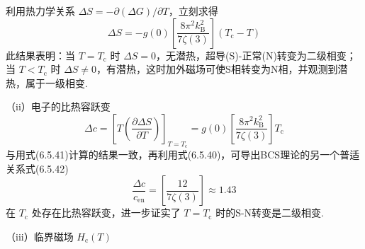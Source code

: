 利用热力学关系 $\Delta S=-\partial(\Delta G)/\partial T$，立刻求得
\begin{equation}
  \Delta S=-g(0)\left[\frac{8\pi^{2}k_{\mathrm{B}}^{2}}{7\zeta(3)}\right]
  \left(T_{\mathrm{c}}-T\right)
\end{equation}
此结果表明：当 $T=T_{\mathrm{c}}$ 时 $\Delta S=0$，无潜热，超导(S)-正常(N)转变为二级相变；当 $T<T_{\mathrm{c}}$ 时 $\Delta S\neq0$，有潜热，这时加外磁场可使S相转变为N相，并观测到潜热，属于一级相变.

（ii）电子的比热容跃变
\begin{equation}
  \Delta c=\left[T\left(\frac{\partial\Delta S}{\partial T}\right)\right]_{T=T_{\mathrm{c}}}
  =g(0)\left[\frac{8\pi^{2}k_{\mathrm{B}}^{2}}{7\zeta(3)}\right]T_{\mathrm{c}}
\end{equation}
与用式(6.5.41)计算的结果一致，再利用式(6.5.40)，可导出BCS理论的另一个普适关系式(6.5.42)
\begin{equation*}
  \frac{\Delta c}{c_{\mathrm{en}}}
  =\left[\frac{12}{7\zeta(3)}\right]\approx1.43
\end{equation*}
在 $T_{\mathrm{c}}$ 处存在比热容跃变，进一步证实了 $T=T_{\mathrm{c}}$ 时的S-N转变是二级相变.

（iii）临界磁场 $H_{\mathrm{c}}(T)$

